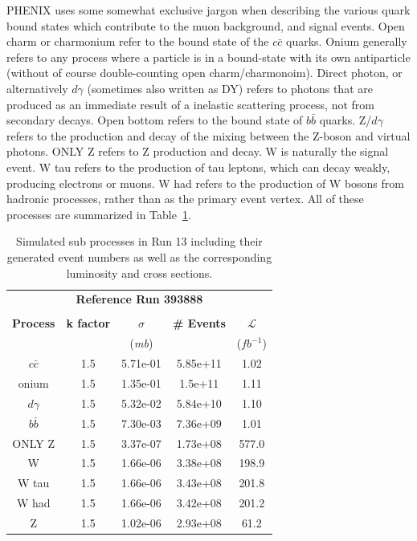 PHENIX uses some somewhat exclusive jargon when describing the various quark
bound states which contribute to the muon background, and signal events.  Open
charm or charmonium refer to the bound state of the $c\bar{c}$ quarks.  Onium
generally refers to any process where a particle is in a bound-state with its
own antiparticle (without of course double-counting open charm/charmonoim).
Direct photon, or alternatively $d\gamma$ (sometimes also written as DY) refers
to photons that are produced as an immediate result of a inelastic scattering
process, not from secondary decays. Open bottom refers to the bound state of
$b\bar{b}$ quarks. Z/$d\gamma$ refers to the production and decay of the mixing
between the Z-boson and virtual photons. ONLY Z refers to Z production and
decay.  W is naturally the signal event. W tau refers to the production of tau
leptons, which can decay weakly, producing electrons or muons. W had refers to
the production of W bosons from hadronic processes, rather than as the primary
event vertex.  All of these processes are summarized in
Table~\ref{tab:simulation_cross_sections}.  
\begin{table}[ht]
  \centering
  \begin{tabular}{ccccc}
    \toprule
    \multicolumn{5}{c}{\textbf{Reference Run 393888}}\\ 
     & & & & \\
    \textbf{Process} & 
    \textbf{k factor} & 
    \textbf{$\sigma$ } & 
    \textbf{\# Events} & 
    \textbf{ $\mathcal{L}$ } \\
    & & (\textit{mb}) &  & ($fb^{-1}$) \\
    \midrule
    $c\bar{c}$ & 1.5 & 5.71e-01 & 5.85e+11 & 1.02\\
    onium      & 1.5 & 1.35e-01 &  1.5e+11 & 1.11\\
    $d\gamma$  & 1.5 & 5.32e-02 & 5.84e+10 & 1.10\\
    $b\bar{b}$ & 1.5 & 7.30e-03 & 7.36e+09 & 1.01\\
    ONLY Z     & 1.5 & 3.37e-07 & 1.73e+08 & 577.0\\
    W          & 1.5 & 1.66e-06 & 3.38e+08 & 198.9\\
    W tau      & 1.5 & 1.66e-06 & 3.43e+08 & 201.8\\
    W had      & 1.5 & 1.66e-06 & 3.42e+08 & 201.2\\
    Z          & 1.5 & 1.02e-06 & 2.93e+08 & 61.2\\
    \bottomrule
  \end{tabular}
  \caption{
    Simulated sub processes in Run 13 including their generated event numbers
    as well as the corresponding luminosity and cross sections.
  }
  \label{tab:simulation_cross_sections}
\end{table}                  

